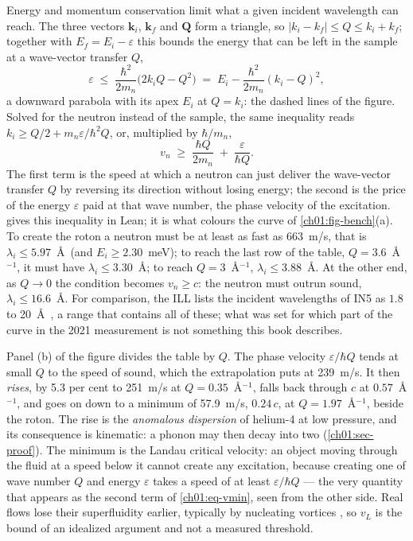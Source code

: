 Energy and momentum conservation limit what a given incident wavelength can reach. The three vectors $\mathbf k_i$, $\mathbf k_f$ and $\mathbf Q$ form a triangle, so $|k_i-k_f|\le Q\le k_i+k_f$; together with $E_f=E_i-\varepsilon$ this bounds the energy that can be left in the sample at a wave-vector transfer $Q$,
\[
\varepsilon\;\le\;\frac{\hbar^2}{2m_n}\bigl(2k_iQ-Q^2\bigr)\;=\;E_i-\frac{\hbar^2}{2m_n}(k_i-Q)^2 ,
\]
a downward parabola with its apex $E_i$ at $Q=k_i$: the dashed lines of the figure. Solved for the neutron instead of the sample, the same inequality reads $k_i\ge Q/2+m_n\varepsilon/\hbar^2Q$, or, multiplied by $\hbar/m_n$,
\begin{equation}
v_n\;\ge\;\frac{\hbar Q}{2m_n}\;+\;\frac{\varepsilon}{\hbar Q}.
\label{ch01:eq-vmin}
\end{equation}
The first term is the speed at which a neutron can just deliver the wave-vector transfer $Q$ by reversing its direction without losing energy; the second is the price of the energy $\varepsilon$ paid at that wave number, the phase velocity of the excitation.  gives this inequality in Lean; it is what colours the curve of \cref{ch01:fig-bench}(a). To create the roton a neutron must be at least as fast as 663~m/s, that is $\lambda_i\le5.97$~\AA\ (and $E_i\ge2.30$~meV); to reach the last row of the table, $Q=3.6$~\AA$^{-1}$, it must have $\lambda_i\le3.30$~\AA; to reach $Q=3$~\AA$^{-1}$, $\lambda_i\le3.88$~\AA. At the other end, as $Q\to0$ the condition becomes $v_n\ge c$: the neutron must outrun sound, $\lambda_i\le16.6$~\AA. For comparison, the ILL lists the incident wavelengths of IN5 as $1.8$ to 20~\AA\ \cite{ILLIN5}, a range that contains all of these; what was set for which part of the curve in the 2021 measurement is not something this book describes.

Panel (b) of the figure divides the table by $Q$. The phase velocity $\varepsilon/\hbar Q$ tends at small $Q$ to the speed of sound, which the extrapolation puts at 239~m/s. It then \emph{rises}, by 5.3 per cent to 251~m/s at $Q=0.35$~\AA$^{-1}$, falls back through $c$ at $0.57$~\AA$^{-1}$, and goes on down to a minimum of 57.9~m/s, $0.24\,c$, at $Q=1.97$~\AA$^{-1}$, beside the roton. The rise is the \emph{anomalous dispersion} of helium-4 at low pressure, and its consequence is kinematic: a phonon may then decay into two (\cref{ch01:sec-proof}). The minimum is the Landau critical velocity: an object moving through the fluid at a speed below it cannot create any excitation, because creating one of wave number $Q$ and energy $\varepsilon$ takes a speed of at least $\varepsilon/\hbar Q$ --- the very quantity that appears as the second term of \eqref{ch01:eq-vmin}, seen from the other side. Real flows lose their superfluidity earlier, typically by nucleating vortices \cite{Donnelly1991}, so $v_L$ is the bound of an idealized argument and not a measured threshold.

